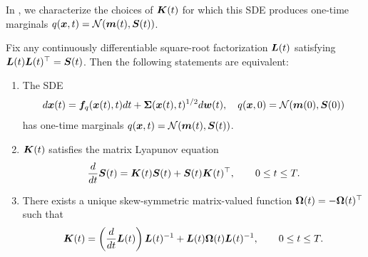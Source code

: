 In , we characterize the choices of $\boldsymbol{K}(t)$ for which this SDE produces one-time marginals $q(\boldsymbol{x},t) = \mathcal{N}(\boldsymbol{m}(t),\boldsymbol{S}(t))$. 
\begin{proposition}
\label{app:prop:gaussian-compatible-drift}
Fix any continuously differentiable square-root factorization $\boldsymbol{L}(t)$ satisfying
$\boldsymbol{L}(t)\boldsymbol{L}(t)^\top=\boldsymbol{S}(t)$. Then the following statements are equivalent:
\begin{enumerate}[label=(\roman*)]
    \item The SDE
    \begin{equation*}
        d\boldsymbol{x}(t) = \boldsymbol{f}_{q}(\boldsymbol{x}(t),t)dt + \boldsymbol{\Sigma}(\boldsymbol{x}(t),t)^{1/2}d\boldsymbol{w}(t), \quad q(\boldsymbol{x}, 0) =  \mathcal{N}(\boldsymbol{m}(0),\boldsymbol{S}(0))
    \end{equation*}
    has one-time marginals $q(\boldsymbol{x},t)=\mathcal{N}(\boldsymbol{m}(t),\boldsymbol{S}(t))$.

    \item $\boldsymbol{K}(t)$ satisfies the matrix Lyapunov equation
    \begin{equation} \label{app:eq:gaussian-lyapunov}
        \frac{d}{d t}\boldsymbol{S}(t) = \boldsymbol{K}(t)\boldsymbol{S}(t) + \boldsymbol{S}(t)\boldsymbol{K}(t)^\top, \qquad 0\leq t\leq T.
    \end{equation}

    \item There exists a unique skew-symmetric matrix-valued function
    $\boldsymbol{\Omega}(t)=-\boldsymbol{\Omega}(t)^\top$ such that
    \begin{equation}\label{app:eq:gaussian-square-root}
        \boldsymbol{K}(t) = \left(\frac{d}{d t}\boldsymbol{L}(t)\right)\boldsymbol{L}(t)^{-1} + \boldsymbol{L}(t)\boldsymbol{\Omega}(t)\boldsymbol{L}(t)^{-1}, \qquad 0\leq t\leq T.
    \end{equation}
\end{enumerate}
\end{proposition}

